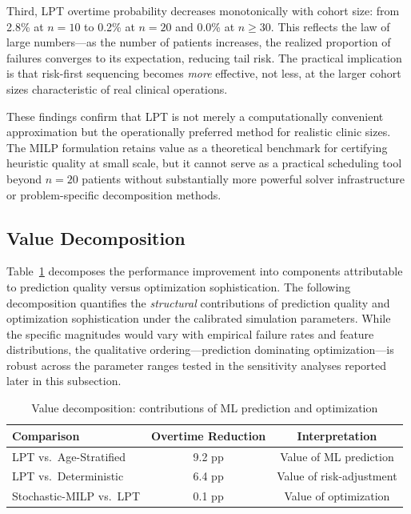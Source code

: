 \documentclass[11pt,a4paper]{article}
\begin{document}
Third, LPT overtime probability decreases monotonically with cohort size: from 2.8\% at $n = 10$ to 0.2\% at $n = 20$ and 0.0\% at $n \geq 30$. This reflects the law of large numbers---as the number of patients increases, the realized proportion of failures converges to its expectation, reducing tail risk. The practical implication is that risk-first sequencing becomes \textit{more} effective, not less, at the larger cohort sizes characteristic of real clinical operations.

These findings confirm that LPT is not merely a computationally convenient approximation but the operationally preferred method for realistic clinic sizes. The MILP formulation retains value as a theoretical benchmark for certifying heuristic quality at small scale, but it cannot serve as a practical scheduling tool beyond $n = 20$ patients without substantially more powerful solver infrastructure or problem-specific decomposition methods.


\subsection{Value Decomposition}
\label{sec:value_analysis}

Table~\ref{tab:value_analysis} decomposes the performance improvement into components attributable to prediction quality versus optimization sophistication. The following decomposition quantifies the \textit{structural} contributions of prediction quality and optimization sophistication under the calibrated simulation parameters. While the specific magnitudes would vary with empirical failure rates and feature distributions, the qualitative ordering---prediction dominating optimization---is robust across the parameter ranges tested in the sensitivity analyses reported later in this subsection.

\begin{table}[htbp]
\centering
\caption{Value decomposition: contributions of ML prediction and optimization}
\label{tab:value_analysis}
\begin{tabular}{@{}lcc@{}}
\toprule
\textbf{Comparison} & \textbf{Overtime Reduction} & \textbf{Interpretation} \\
\midrule
LPT vs.\ Age-Stratified & 9.2 pp & Value of ML prediction \\
LPT vs.\ Deterministic & 6.4 pp & Value of risk-adjustment \\
Stochastic-MILP vs.\ LPT & 0.1 pp & Value of optimization \\
\bottomrule
\end{tabular}
\end{table}
\end{document}
